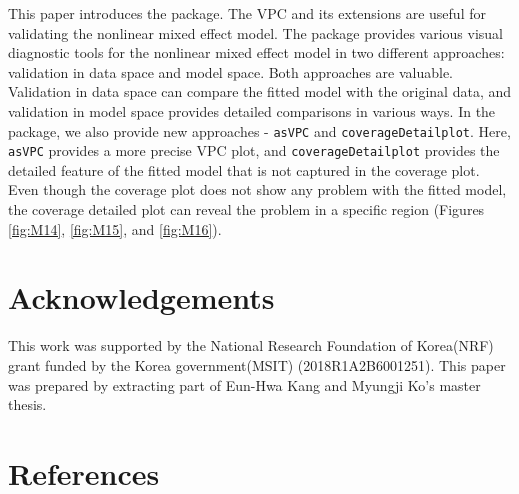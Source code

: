 This paper introduces the  package. The VPC and its extensions are useful for validating the nonlinear mixed effect model. The  package provides various visual diagnostic tools for the nonlinear mixed effect model in two different approaches: validation in data space and model space. Both approaches are valuable. Validation in data space can compare the fitted model with the original data, and validation in model space provides detailed comparisons in various ways. In the  package, we also provide new approaches - \texttt{asVPC} and \texttt{coverageDetailplot}. Here, \texttt{asVPC} provides a more precise VPC plot, and \texttt{coverageDetailplot} provides the detailed feature of the fitted model that is not captured in the coverage plot. Even though the coverage plot does not show any problem with the fitted model, the coverage detailed plot can reveal the problem in a specific region (Figures \ref{fig:M14}, \ref{fig:M15}, and \ref{fig:M16}).

\hypertarget{acknowledgements}{%
\section{Acknowledgements}\label{acknowledgements}}

This work was supported by the National Research Foundation of Korea(NRF) grant funded by the Korea government(MSIT) (2018R1A2B6001251). This paper was prepared by extracting part of Eun-Hwa Kang and Myungji Ko's master thesis.

\hypertarget{references}{%
\section*{References}\label{references}}

